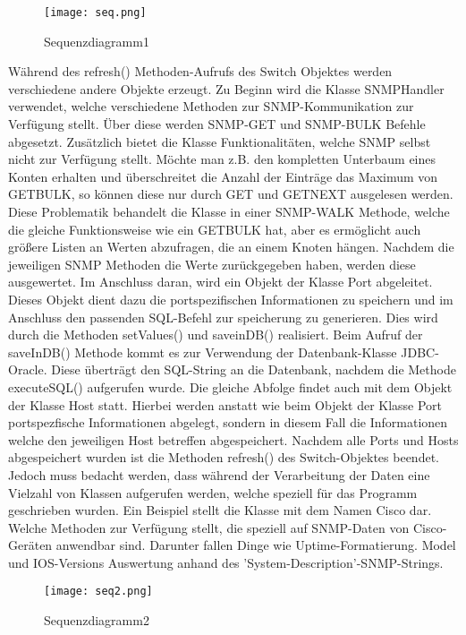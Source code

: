 \begin{figure}[H]
\centering
\texttt{[image: seq.png]}
\caption{Sequenzdiagramm1}
\label{fig:sequecediagram1}
\end{figure}

Während des refresh() Methoden-Aufrufs des Switch Objektes werden verschiedene andere Objekte erzeugt. Zu Beginn wird die Klasse SNMPHandler verwendet, welche verschiedene Methoden zur SNMP-Kommunikation zur Verfügung stellt. Über diese werden SNMP-GET und SNMP-BULK Befehle abgesetzt. Zusätzlich bietet die Klasse Funktionalitäten, welche SNMP selbst nicht zur Verfügung stellt. Möchte man z.B. den kompletten Unterbaum eines Konten erhalten und überschreitet die Anzahl der Einträge das Maximum von GETBULK, so können diese nur durch GET und GETNEXT ausgelesen werden. Diese Problematik behandelt die Klasse in einer SNMP-WALK Methode, welche die gleiche Funktionsweise wie ein GETBULK hat, aber es ermöglicht auch größere Listen an Werten abzufragen, die an einem Knoten hängen. Nachdem die jeweiligen SNMP Methoden die Werte zurückgegeben haben, werden diese ausgewertet. Im Anschluss daran, wird ein Objekt der Klasse Port abgeleitet. Dieses Objekt dient dazu die portspezifischen Informationen zu speichern und im Anschluss den passenden SQL-Befehl zur speicherung zu generieren. Dies wird durch die Methoden setValues() und saveinDB() realisiert.
Beim Aufruf der saveInDB() Methode kommt es zur Verwendung der Datenbank-Klasse JDBC-Oracle. Diese überträgt den SQL-String an die Datenbank, nachdem die Methode executeSQL() aufgerufen wurde.
Die gleiche Abfolge findet auch mit dem Objekt der Klasse Host statt. Hierbei werden anstatt wie beim Objekt der Klasse Port portspezfische Informationen abgelegt, sondern in diesem Fall die Informationen welche den jeweiligen Host betreffen abgespeichert.
Nachdem alle Ports und Hosts abgespeichert wurden ist die Methoden refresh() des Switch-Objektes beendet.\\
Jedoch muss bedacht werden, dass während der Verarbeitung der Daten eine Vielzahl von Klassen aufgerufen werden, welche speziell für das Programm geschrieben wurden. Ein Beispiel stellt die Klasse mit dem Namen Cisco dar. Welche Methoden zur Verfügung stellt, die speziell auf SNMP-Daten von Cisco-Geräten anwendbar sind. Darunter fallen Dinge wie Uptime-Formatierung. Model und IOS-Versions Auswertung anhand des 'System-Description'-SNMP-Strings.


\begin{figure}[H]
\centering
\texttt{[image: seq2.png]}
\caption{Sequenzdiagramm2}
\label{fig:sequecediagram2}
\end{figure}

